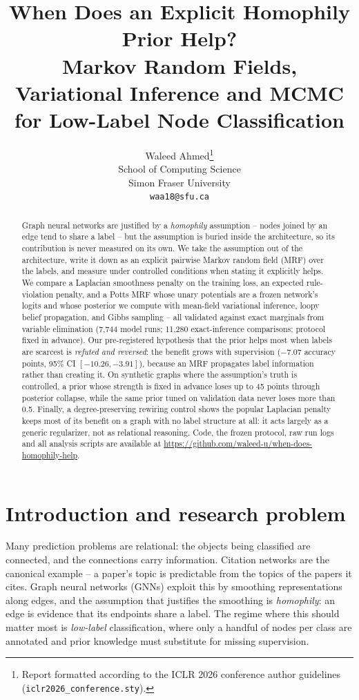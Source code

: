 \documentclass{article}
\title{
When Does an Explicit Homophily Prior Help? \\
Markov Random Fields, Variational Inference and MCMC \\
for Low-Label Node Classification
}
\author{Waleed Ahmed\thanks{Report formatted according to the ICLR 2026 conference
author guidelines (\texttt{iclr2026\_conference.sty}).} \\
School of Computing Science \\
Simon Fraser University \\
\texttt{waa18@sfu.ca}
}
\begin{document}
\maketitle

\begin{abstract}
Graph neural networks are justified by a \emph{homophily} assumption -- nodes joined by an edge
tend to share a label -- but the assumption is buried inside the architecture, so its
contribution is never measured on its own. We take the assumption out of the architecture, write
it down as an explicit pairwise Markov random field (MRF) over the labels, and measure under
controlled conditions when stating it explicitly helps. We compare a Laplacian smoothness
penalty on the training loss, an expected rule-violation penalty, and a Potts MRF whose unary
potentials are a frozen network's logits and whose posterior we compute with mean-field
variational inference, loopy belief propagation, and Gibbs sampling -- all validated against
exact marginals from variable elimination (7{,}744 model runs; 11{,}280 exact-inference
comparisons; protocol fixed in advance). Our pre-registered hypothesis that the prior helps most
when labels are scarcest is \emph{refuted and reversed}: the benefit grows with supervision
($-7.07$ accuracy points, 95\% CI $[-10.26,-3.91]$), because an MRF propagates label information
rather than creating it. On synthetic graphs where the assumption's truth is controlled, a prior
whose strength is fixed in advance loses up to 45 points through posterior collapse, while the
same prior tuned on validation data never loses more than 0.5. Finally, a degree-preserving
rewiring control shows the popular Laplacian penalty keeps most of its benefit on a graph with
no label structure at all: it acts largely as a generic regularizer, not as relational
reasoning. Code, the frozen protocol, raw run logs and all analysis scripts are available at
\url{https://github.com/waleed-u/when-does-homophily-help}.
\end{abstract}

\section{Introduction and research problem}

Many prediction problems are relational: the objects being classified are connected, and the
connections carry information. Citation networks are the canonical example -- a paper's topic is
predictable from the topics of the papers it cites. Graph neural networks (GNNs) exploit this by
smoothing representations along edges, and the assumption that justifies the smoothing is
\emph{homophily}: an edge is evidence that its endpoints share a label. The regime where this
should matter most is \emph{low-label} classification, where only a handful of nodes per class
are annotated and prior knowledge must substitute for missing supervision.
\end{document}
